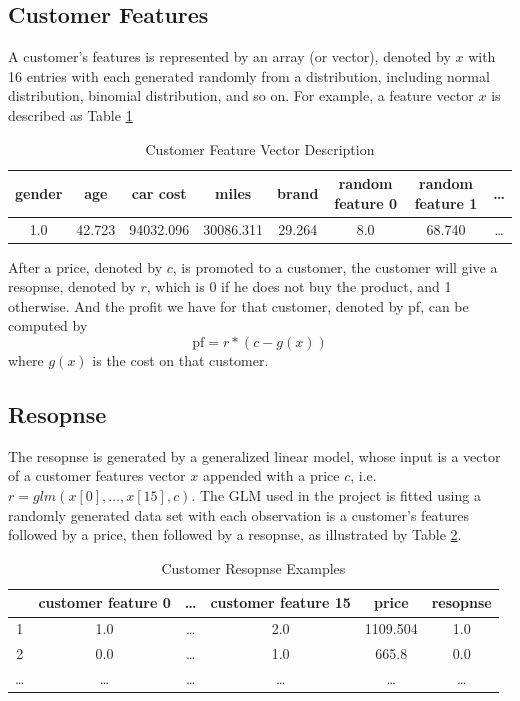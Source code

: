 \documentclass[balance,upint,subscriptcorrection,varvw,mathalfa=cal=boondoxo,pdf-a,nofoot]{asmeconf}
\begin{document}
\subsection{Customer Features}
\noindent A customer's features is represented by an array (or vector), denoted 
by \(x\) with 16 entries with each generated randomly from a distribution, 
including normal distribution, binomial distribution, and so on. For example, 
a feature vector \(x\) is described as Table \ref{tab:feature-vector}
\begin{table}
    \caption[Table]{
        Customer Feature Vector Description\label{tab:feature-vector}
    }
    \centering
    \begin{tabular}{c|c|c|c|c|c|c|c}
        gender & age & car cost & miles & brand & random feature 0 & random 
        feature 1 & \dots\\
        \hline
        1.0 & 42.723 & 94032.096 & 30086.311 & 29.264 & 8.0 & 68.740 & \dots
    \end{tabular}
\end{table}

\noindent After a price, denoted by \(c\), is promoted to a customer, the 
customer will give a resopnse, denoted by \(r\), which is 0 if he does not buy
the product, and 1 otherwise. And the profit we have for that customer, 
denoted by pf, can be computed by
\[\text{pf} = r*\left(c - g(x)\right)\]
where \(g(x)\) is the cost on that customer.

\subsection{Resopnse}
\noindent The resopnse is generated by a generalized linear model, whose input 
is a vector of a customer features vector \(x\) appended with a price \(c\), 
i.e. \(r=glm(x[0], \dots, x[15], c)\).
\vspace{3mm}\newline The GLM used in the project is fitted using a randomly
generated data set with each observation is a customer's features followed by 
a price, then followed by a resopnse, as illustrated by 
Table \ref{tab:response}.
\begin{table}
    \caption[Table]{Customer Resopnse Examples\label{tab:response}}
    \centering
    \begin{tabular}{c|c|c|c|c|c}
        & customer feature 0 & \dots & customer feature 15 & price & resopnse\\
        \hline
        1 & 1.0 & \dots & 2.0 & 1109.504 & 1.0\\
        \hline
        2 & 0.0 & \dots & 1.0 & 665.8 & 0.0\\
        \hline
        \dots & \dots & \dots & \dots & \dots & \dots
    \end{tabular}
\end{table}
\end{document}
